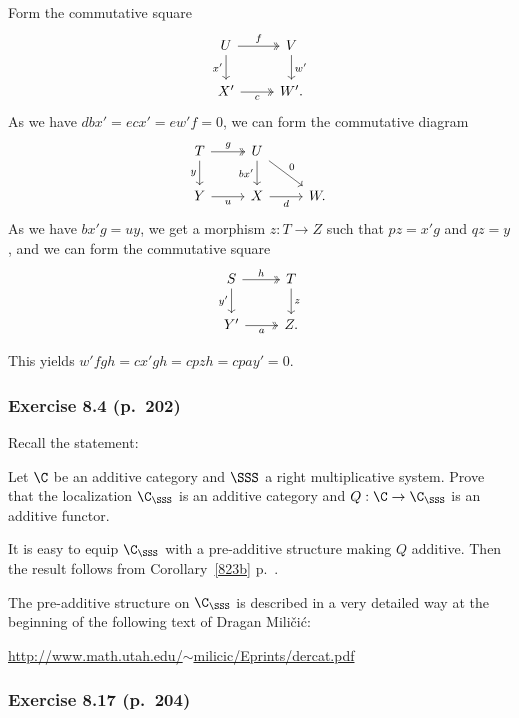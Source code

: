 \documentclass[12pt]{article}
\theoremstyle{remark}
\theoremstyle{definition}
\begin{document}
Form the commutative square
$$
\begin{tikzcd} 
U\ar[d,"x'"']\ar[r,twoheadrightarrow,"f"]&V\ar[d,"w'"]\\ 
X'\ar[r,twoheadrightarrow,"c"']&W'.
\end{tikzcd}
$$ 
As we have $dbx'=ecx'=ew'f=0$, we can form the commutative diagram
$$
\begin{tikzcd} 
T\ar[d,"y"']\ar[r,twoheadrightarrow,"g"]&U\ar[d,"bx'"']\ar[rd,"0"]\\ 
Y\ar[r,"u"']&X\ar[r,"d"']&W.
\end{tikzcd}
$$ 
As we have $bx'g=uy$, we get a morphism $z:T\to Z$ such that $pz=x'g$ and $qz=y$, and we can form the commutative square
$$
\begin{tikzcd} 
S\ar[d,"y'"']\ar[r,twoheadrightarrow,"h"]&T\ar[d,"z"]\\ 
Y'\ar[r,twoheadrightarrow,"a"']&Z.
\end{tikzcd}
$$ 

This yields $w'fgh=cx'gh=cpzh=cpay'=0$.



\subsubsection{Exercise 8.4 (p.~202)}

Recall the statement: 

Let $\C$ be an additive category and $\SSS$ a right multiplicative system. Prove that the localization $\C_\SSS$ is an additive category and $Q:\C\to\C_\SSS$ is an additive functor. 

It is easy to equip $\C_\SSS$ with a pre-additive structure making $Q$ additive. Then the result follows from Corollary~\ref{823b} p.~. 

The pre-additive structure on $\C_\SSS$ is described in a very detailed way at the beginning of the following text of Dragan Mili\v{c}i\'c:  
%
\begin{center}\href{http://www.math.utah.edu/~milicic/Eprints/dercat.pdf}{http://www.math.utah.edu/$\sim$milicic/Eprints/dercat.pdf}
\end{center} 


\subsubsection{Exercise 8.17 (p.~204)} 
\end{document}
